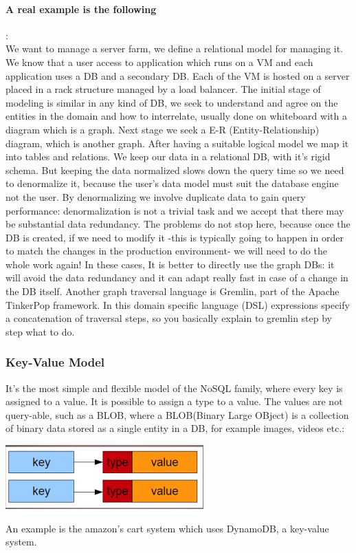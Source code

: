\documentclass[a4page, 11pt]{article}
\begin{document}
\paragraph{A real example is the following}:\\ 
We want to manage a server farm, we define a relational model for managing it. 
We know that a user access to application which runs on a VM and each application uses a DB and a secondary DB. 
Each of the VM is hosted on a server placed in a rack structure managed by a load balancer.
\newline
The initial stage of modeling is similar in any kind of DB, we seek to understand and agree on the entities in the domain and how to interrelate, usually done on whiteboard with a diagram which is a graph.
Next stage we seek a E-R (Entity-Relationship) diagram, which is another graph. 
After having a suitable logical model we map it into tables and relations. 
We keep our data in a relational DB, with it's rigid schema.
But keeping the data normalized slows down the query time so we need to denormalize it, because the user's data model must suit the database engine not the user. 
By denormalizing we involve duplicate data to gain query performance: denormalization is not a trivial task and we accept that there may be substantial data redundancy. 
The problems do not stop here, because once the DB is created, if we need to modify it -this is typically going to happen in order to match the changes in the production environment- we will need to do the whole work again!
\newline
In these cases, It is better to directly use the graph DBs: it will avoid the data redundancy and it can adapt really fast in case of a change in the DB itself.
\newline
Another graph traversal language is Gremlin, part of the Apache TinkerPop framework. In this domain specific language (DSL) expressions specify a concatenation of traversal steps, so you basically explain to gremlin step by step what to do.

\subsubsection{Key-Value Model}

It's the most simple and flexible model of the NoSQL family, where every key is assigned to a value. It is possible to assign a type to a value.
The values are not query-able, such as a BLOB, where a BLOB(Binary Large OBject) is a collection of binary data stored as a single entity in a DB, for example images, videos etc.:
\begin{center}
\includegraphics[scale=0.5]{IMAGE3.jpg}
\end{center}
An example is the amazon's cart system which uses DynamoDB, a key-value system.
\end{document}
